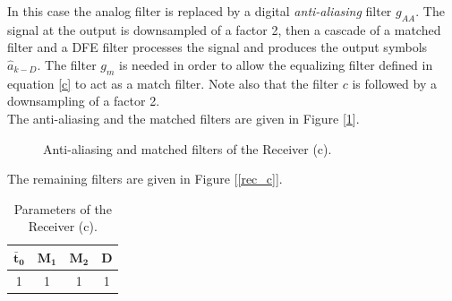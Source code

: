 \documentclass[a4paper, 12pt]{report}
\begin{document}
In this case the analog filter is replaced by a digital \textit{anti-aliasing} filter $g_{AA}$. The signal at the output is downsampled of a factor 2, then a cascade of a matched filter and a DFE  filter processes the signal and produces the output symbols $\hat{a}_{k-D}$. The filter $g_m$ is needed in order to allow the equalizing filter defined in equation \ref{c} to act as a match filter. Note also that the filter $c$ is followed by a downsampling of a factor 2. \\
The anti-aliasing and the matched filters are given in Figure [\ref{filters_c}].

\begin{figure}[H]
	\centering
	\caption{Anti-aliasing and matched filters of the Receiver (c).}\label{filters_c}
\end{figure}

The remaining filters are given in Figure [\ref{rec_c}].
\begin{table}[H]
	\centering
	\begin{tabular}{c c c c}
		\toprule
		$\mathbf{\bar{t}_0}$ & $\mathbf{M_1}$ & $\mathbf{M_2}$ & \textbf{D}     \\
		\midrule
		1 & 1 & 1 & 1 \\
		\bottomrule			
	\end{tabular}
	\caption{Parameters of the Receiver (c).}
	\label{Tab_c}
\end{table}
\end{document}
